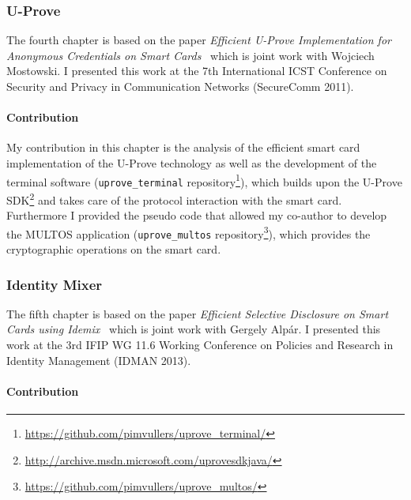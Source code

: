 \subsubsection{U-Prove}

The fourth chapter is based on the paper \emph{Efficient U-Prove Implementation
for Anonymous Credentials on Smart Cards}~\cite{MostowskiVullers11} which is
joint work with Wojciech Mostowski. I presented this work at the 7th
International ICST Conference on Security and Privacy in Communication Networks
(SecureComm 2011).

\paragraph{Contribution}

My contribution in this chapter is the analysis of the efficient smart card
implementation of the U-Prove technology as well as the development of the
terminal software (\texttt{uprove\_terminal} repository\footnote{%
\url{https://github.com/pimvullers/uprove_terminal/}}), which builds upon the
U-Prove SDK\footnote{\url{http://archive.msdn.microsoft.com/uprovesdkjava/}}
and takes care of the protocol interaction with the smart card. Furthermore I
provided the pseudo code that allowed my co-author to develop the MULTOS
application (\texttt{uprove\_multos} repository\footnote{%
\url{https://github.com/pimvullers/uprove_multos/}}), which provides the
cryptographic operations on the smart card.

\subsubsection{Identity Mixer}

The fifth chapter is based on the paper \emph{Efficient Selective Disclosure on
Smart Cards using Idemix}~\cite{VullersAlpar2013} which is joint work with
Gergely Alp\'ar. I presented this work at the 3rd IFIP WG 11.6 Working
Conference on Policies and Research in Identity Management (IDMAN 2013).

\paragraph{Contribution}


